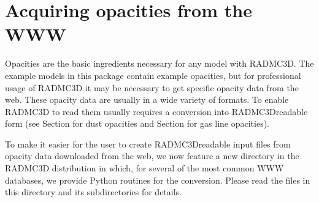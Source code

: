 \documentclass[letterpaper,10pt,english]{sphinxmanual}
\begin{document}
\chapter{Acquiring opacities from the WWW}
\label{\detokenize{opacitieswww:acquiring-opacities-from-the-www}}\label{\detokenize{opacitieswww:chap-acquiring-opacities}}\label{\detokenize{opacitieswww::doc}}
Opacities are the basic ingredients necessary for any model with
RADMC\sphinxhyphen{}3D. The example models in this package contain example opacities, but
for professional usage of RADMC\sphinxhyphen{}3D it may be necessary to get specific
opacity data from the web. These opacity data are usually in a wide variety
of formats. To enable RADMC\sphinxhyphen{}3D to read them usually requires a conversion
into RADMC\sphinxhyphen{}3D\sphinxhyphen{}readable form (see Section {\hyperref[\detokenize{inputoutputfiles:sec-opacities}]{}} for dust
opacities and Section {\hyperref[\detokenize{lineradtrans:sec-molecule-xxx-inp}]{}} for gas line opacities).

To make it easier for the user to create RADMC\sphinxhyphen{}3D\sphinxhyphen{}readable input files
from opacity data downloaded from the web, we now feature a new directory
 in the RADMC\sphinxhyphen{}3D distribution in which, for several of
the most common WWW databases, we provide Python routines for the conversion.
Please read the  files in this directory and its
subdirectories for details.
\end{document}
